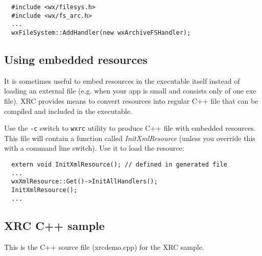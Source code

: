 \begin{verbatim}
  #include <wx/filesys.h>
  #include <wx/fs_arc.h>
  ...
  wxFileSystem::AddHandler(new wxArchiveFSHandler);
\end{verbatim}

\subsection{Using embedded resources}\label{embeddedresource}

It is sometimes useful to embed resources in the executable itself instead
of loading an external file (e.g. when your app is small and consists only of one
exe file). XRC provides means to convert resources into regular C++ file that
can be compiled and included in the executable. 

Use the {\tt -c} switch to
{\tt wxrc} utility to produce C++ file with embedded resources. This file will
contain a function called {\it InitXmlResource} (unless you override this with
a command line switch). Use it to load the resource:

\begin{verbatim}
  extern void InitXmlResource(); // defined in generated file
  ...
  wxXmlResource::Get()->InitAllHandlers();
  InitXmlResource();
  ...
\end{verbatim}

\subsection{XRC C++ sample}\label{xrccppsample}

This is the C++ source file (xrcdemo.cpp) for the XRC sample.

